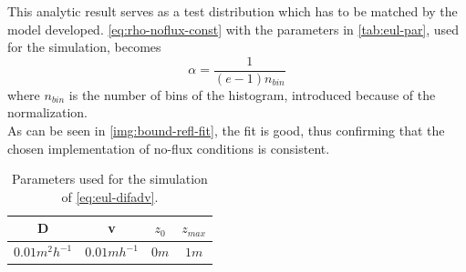 This analytic result serves as a test distribution which has to be matched by the model developed. 
\autoref{eq:rho-noflux-const} with the parameters in \autoref{tab:eul-par}, used for the simulation, becomes 
\[ \alpha = \frac{1}{(e-1)n_{bin}} \]
where $n_{bin}$ is the number of bins of the histogram, introduced because of the normalization. \\
As can be seen in \autoref{img:bound-refl-fit}, the fit is good, thus confirming that the chosen implementation of no-flux conditions is consistent.

\begin{table} 
  \begin{center}
    \begin{tabular}{ c | c | c | c} 
      \hline
      D               & v             & $z_0$    & $z_{max}$ \\ \hline
      $0.01m^2h^{-1}$ & $0.01mh^{-1}$ & $0m$     & $1m$        \\
      \hline
    \end{tabular}
  \end{center}
  \caption{Parameters used for the simulation of \autoref{eq:eul-difadv}. }
  \label{tab:eul-par}
\end{table}

